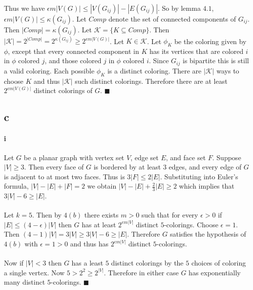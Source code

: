 \documentclass[letterpaper,12pt,oneside,onecolumn]{report}
\begin{document}
\paragraph{}
Thus we have $\epsilon m |V(G)| \leq |V(G_{ij})| - |E(G_{ij})|$. So by lemma $4.1$, $\epsilon m |V(G)| \leq \kappa(G_{ij})$. Let $Comp$ denote the set of connected components of $G_{ij}$. Then $|Comp| = \kappa(G_{ij})$. Let $\mathcal{K} = \{ K \subseteq Comp \}$. Then $|\mathcal{K}| = 2^{|Comp|} = 2^{\kappa(G_{ij})} \geq 2^{\epsilon m |V(G)|}$. Let $K \in \mathcal{K}$. Let $\phi_{K}$ be the coloring given by $\phi$, except that every connected component in $K$ has its vertices that are colored $i$ in $\phi$ colored $j$, and those colored $j$ in $\phi$ colored $i$. Since $G_{ij}$ is bipartite this is still a valid coloring. Each possible $\phi_{K}$ is a distinct coloring. There are $|\mathcal{K}|$ ways to choose $K$ and thus $|\mathcal{K}|$ such distinct colorings. Therefore there are at least $2^{\epsilon m |V(G)|}$ distinct colorings of $G$. $\blacksquare$
\subsection*{c}
\paragraph{i}
Let $G$ be a planar graph with vertex set $V$, edge set $E$, and face set $F$. Suppose $|V| \geq 3$. Then every face of $G$ is bordered by at least $3$ edges, and every edge of $G$ is adjacent to at most two faces. Thus is $3|F| \leq 2|E|$. Substituting into Euler's formula, $|V| - |E| + |F| = 2$ we obtain $|V| -|E| + \frac{2}{3}|E| \geq 2$ which implies that $3|V| - 6 \geq |E|$.
\paragraph{}
Let $k = 5$. Then by $4(b)$ there exists $m > 0$ such that for every $\epsilon > 0 $ if $|E| \leq (4 - \epsilon)|V|$ then $G$ has at least $2^{\epsilon m |V|}$ distinct $5$-colorings. Choose $\epsilon = 1$. Then $(4 - 1)|V| = 3|V|\geq 3|V| - 6 \geq |E|$. Therefore $G$ satisfies the hypothesis of $4(b)$ with $\epsilon = 1 > 0$ and thus has $2^{\epsilon m |V|}$ distinct $5$-colorings.
\paragraph{}
Now if $|V| < 3$ then $G$ has a least $5$ distinct colorings by the $5$ choices of coloring a single vertex. Now $5 > 2^2 \geq 2^{|V|}$. Therefore in either case $G$ has exponentially many distinct $5$-colorings. $\blacksquare$
\end{document}
